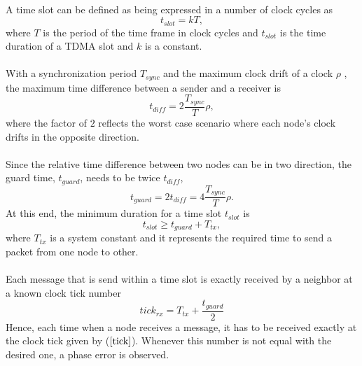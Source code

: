 \documentclass[a4paper,10pt]{report}
\begin{document}
\paragraph*{}
A time slot can be defined as being expressed in a number of clock cycles as
\begin{equation}
t_{slot} = kT ,
\end{equation}
where $T$ is the period of the time frame in clock cycles and $t_{slot}$ is the time duration of a TDMA slot and $k$ is a constant.
\paragraph*{}
With a synchronization period $T_{sync}$ and the maximum clock drift of a clock $\rho$ , the maximum time difference between a sender and a receiver is
\begin{equation}
t_{diff} = 2\frac{T_{sync}}{T}\rho ,
\end{equation}
where the factor of $2$ reflects the worst case scenario where each node's clock drifts in the opposite direction.
\paragraph*{}
Since the relative time difference between two nodes can be in two direction, the guard time, $t_{guard}$, needs to be twice $t_{diff}$,
\begin{equation}
t_{guard}= 2t_{diff} = 4\frac{T_{sync}}{T}\rho.
\end{equation}
At this end, the minimum duration for a time slot $t_{slot}$ is
\begin{equation}
t_{slot} \geq t_{guard} + T_{tx},
\end{equation}
where $T_{tx}$ is a system constant and it represents the required time to send a packet from one node to other.
\paragraph*{} Each message that is send within a time slot is exactly received by a neighbor at a known clock tick number
\begin{equation}
tick_{rx} = T_{tx}+ \frac{t_{guard}}{2} \label{tick}
\end{equation}
Hence, each time when a node receives a message, it has to be received exactly at the clock tick given by ($\ref{tick}$). Whenever
this number is not equal with the desired one, a phase error is observed.
\end{document}
